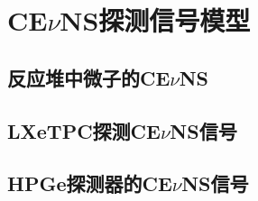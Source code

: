 
\chapter{CE$\nu$NS探测信号模型}

\section{反应堆中微子的CE$\nu$NS}

\section{LXeTPC探测CE$\nu$NS信号}

\section{HPGe探测器的CE$\nu$NS信号}
